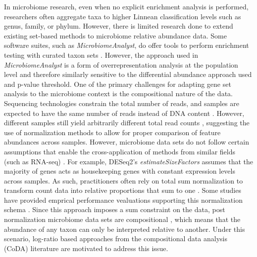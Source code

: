 In microbiome research, even when no explicit enrichment analysis is performed, researchers often aggregate taxa to higher Linnean classification levels such as genus, family, or phylum. However, there is limited research done to extend existing set-based methods to microbiome relative abundance data. Some software suites, such as \emph{MicrobiomeAnalyst}, do offer tools to perform enrichment testing with curated taxon sets \cite{chong2020}. However, the approach used in \emph{MicrobiomeAnalyst} is a form of overrepresentation analysis at the population level and therefore similarly sensitive to the differential abundance approach used and p-value threshold. One of the primary challenges for adapting gene set analysis to the microbiome context is the compositional nature of the data. Sequencing technologies constrain the total number of reads, and samples are expected to have the same number of reads instead of DNA content \cite{quinn2019, quinn2018}. However, different samples still yield arbitrarily different total read counts \cite{morton2019, gloor2017}, suggesting the use of normalization methods to allow for proper comparison of feature abundances across samples. However, microbiome data sets do not follow certain assumptions that enable the cross-application of methods from similar fields (such as RNA-seq) \cite{quinn2019, quinn2018}. For example, DESeq2's \emph{estimateSizeFactors} \cite{love2014} assumes that the majority of genes acts as housekeeping genes with constant expression levels across samples. As such, practitioners often rely on total sum normalization to transform count data into relative proportions that sum to one \cite{weiss2017}. Some studies have provided emprical performance vealuations supporting this normalization schema \cite{mcknight2019}. Since this approach imposes a sum constraint on the data, post normalization microbiome data sets are compositional \cite{gloor2017}, which means that the abundance of any taxon can only be interpreted relative to another. Under this scenario, log-ratio based approaches from the compositional data analysis (CoDA) literature \cite{aitchison1994} are motivated to address this issue. 

